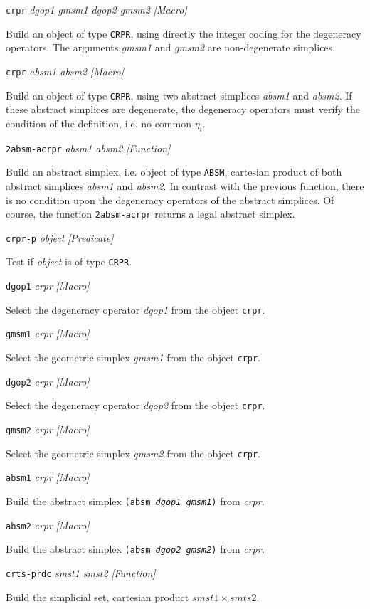 {{\parindent=0mm
{\leftskip=5mm 
{\tt crpr} {\em dgop1 gmsm1 dgop2 gmsm2} \hfill {\em [Macro]} \par}
{\leftskip=15mm 
Build an object of type {\tt CRPR}, using directly the integer coding for the
degeneracy operators. The arguments {\em gmsm1} and {\em gmsm2} are non-degenerate
simplices.  \par}
{\leftskip=5mm 
{\tt crpr} {\em absm1 absm2} \hfill {\em [Macro]} \par}
{\leftskip=15mm 
Build an object of type {\tt CRPR}, using two abstract simplices {\em absm1} and {\em absm2}. If these
abstract simplices are degenerate, the de\-ge\-ne\-ra\-cy operators must verify the condition of
the definition, i.e. no common $\eta_i$. \par}
{\leftskip=5mm 
{\tt 2absm-acrpr} {\em absm1 absm2} \hfill {\em [Function]} \par}
{\leftskip=15mm 
Build an abstract simplex, i.e. object of type {\tt ABSM}, cartesian pro\-duct of both abstract simplices {\em absm1} 
and {\em absm2}. In contrast with the previous function, there is no condition upon the
de\-ge\-ne\-ra\-cy operators of the abstract simplices. Of course, the function {\tt 2absm-acrpr} returns
a legal abstract simplex. \par}
{\leftskip=5mm 
{\tt crpr-p} {\em object} \hfill {\em [Predicate]} \par}
{\leftskip=15mm 
Test if {\em object} is of type {\tt CRPR}. \par}
{\leftskip=5mm 
{\tt dgop1} {\em crpr} \hfill {\em [Macro]} \par}
{\leftskip=15mm 
Select the degeneracy operator {\em dgop1} from the object {\tt crpr}. \par}
{\leftskip=5mm 
{\tt gmsm1} {\em crpr} \hfill {\em [Macro]} \par}
{\leftskip=15mm 
Select the geometric simplex {\em gmsm1} from the object {\tt crpr}. \par}
{\leftskip=5mm 
{\tt dgop2} {\em crpr} \hfill {\em [Macro]} \par}
{\leftskip=15mm 
Select the degeneracy operator {\em dgop2} from the object {\tt crpr}. \par}
{\leftskip=5mm 
{\tt gmsm2} {\em crpr} \hfill {\em [Macro]} \par}
{\leftskip=15mm 
Select the geometric simplex {\em gmsm2} from the object {\tt crpr}. \par}
{\leftskip=5mm 
{\tt absm1} {\em crpr} \hfill {\em [Macro]} \par}
{\leftskip=15mm 
Build the abstract simplex {\tt (absm {\em dgop1 gmsm1})} from {\em crpr}. \par}
{\leftskip=5mm 
{\tt absm2} {\em crpr} \hfill {\em [Macro]} \par}
{\leftskip=15mm 
Build the abstract simplex {\tt (absm {\em dgop2 gmsm2})} from {\em crpr}. \par}
{\leftskip=5mm 
{\tt crts-prdc} {\em smst1 smst2} \hfill {\em [Function]} \par}
{\leftskip=15mm 
Build the simplicial set, cartesian product $smst1 \times smts2$. \par}
}

}

